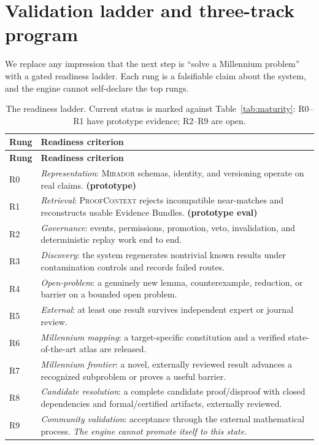 \documentclass[11pt]{amsart}
\theoremstyle{definition}
\theoremstyle{remark}
\newcommand{\mirador}{\textsc{Mirador}}
\newcommand{\pc}{\textsc{ProofContext}}
\begin{document}
\section{Validation ladder and three-track program}\label{sec:validation}

We replace any impression that the next step is ``solve a Millennium problem''
with a gated readiness ladder. Each rung is a falsifiable claim about the system,
and the engine cannot self-declare the top rungs.

{\footnotesize
\begin{longtable}{@{}p{}p{}@{}}
\caption{The readiness ladder. Current status is marked against
Table~\ref{tab:maturity}: R0--R1 have prototype evidence; R2--R9 are
open.}\label{tab:ladder}\\
\toprule
\textbf{Rung} & \textbf{Readiness criterion}\\ \midrule
\endfirsthead
\toprule \textbf{Rung} & \textbf{Readiness criterion}\\ \midrule \endhead
R0 & \emph{Representation}: \mirador{} schemas, identity, and versioning operate
on real claims. \textbf{(prototype)}\\
R1 & \emph{Retrieval}: \pc{} rejects incompatible near-matches and reconstructs
usable Evidence Bundles. \textbf{(prototype eval)}\\
R2 & \emph{Governance}: events, permissions, promotion, veto, invalidation, and
deterministic replay work end to end.\\
R3 & \emph{Discovery}: the system regenerates nontrivial known results under
contamination controls and records failed routes.\\
R4 & \emph{Open-problem}: a genuinely new lemma, counterexample, reduction, or
barrier on a bounded open problem.\\
R5 & \emph{External}: at least one result survives independent expert or journal
review.\\
R6 & \emph{Millennium mapping}: a target-specific constitution and a verified
state-of-the-art atlas are released.\\
R7 & \emph{Millennium frontier}: a novel, externally reviewed result advances a
recognized subproblem or proves a useful barrier.\\
R8 & \emph{Candidate resolution}: a complete candidate proof/disproof with closed
dependencies and formal/certified artifacts, externally reviewed.\\
R9 & \emph{Community validation}: acceptance through the external mathematical
process. \emph{The engine cannot promote itself to this state.}\\
\bottomrule
\end{longtable}
}
\end{document}
